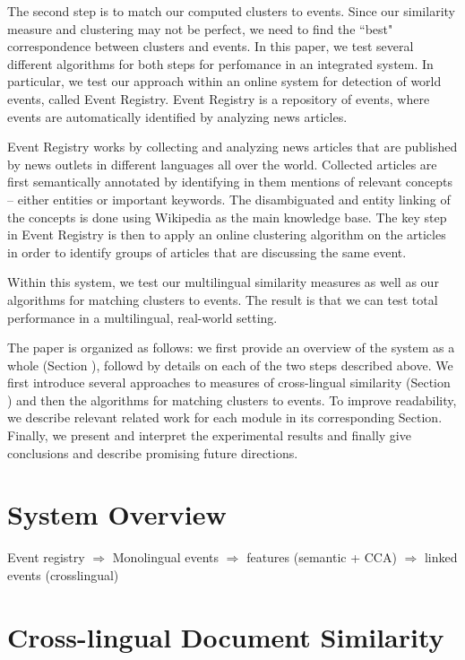 \documentclass[twoside,11pt]{article}
\begin{document}
The second step is to match our computed clusters to events. Since our similarity measure and clustering
may not be perfect, we need to find the ``best" correspondence between clusters and events. In this paper, we test several different algorithms for both steps for perfomance in an integrated system. In particular, we test our approach within an online system for detection of world events, called Event Registry\cite{}. Event Registry is a repository of events, where events are automatically identified by analyzing news articles.

Event Registry works by collecting and analyzing news articles that are published by news outlets in different languages all over the world. Collected articles are first semantically annotated by identifying in them mentions of relevant concepts -- either entities or important keywords. The disambiguated and entity linking of the concepts is done using Wikipedia as the main knowledge base.
   The key step in Event Registry is then to apply an online clustering algorithm on the articles in order to identify groups of articles that are discussing the same event.

   Within this system, we test our multilingual similarity measures as well as our algorithms for matching clusters to events.  The result is that we can test total performance in a multilingual, real-world setting.

The paper is organized as follows: we first provide an overview of the system as a whole (Section ), followd by details on each of the two steps described above. We first introduce several approaches to measures of cross-lingual similarity (Section ) and then the algorithms for matching clusters to events.  To improve readability, we describe relevant related work for each module in its corresponding Section.
Finally, we present and interpret the experimental results and finally give conclusions and describe promising future directions.

\section{System Overview}

Event registry $\Rightarrow$ Monolingual events $\Rightarrow$ features (semantic + CCA) $\Rightarrow$ linked events (crosslingual)


\section{Cross-lingual Document Similarity}
\end{document}

